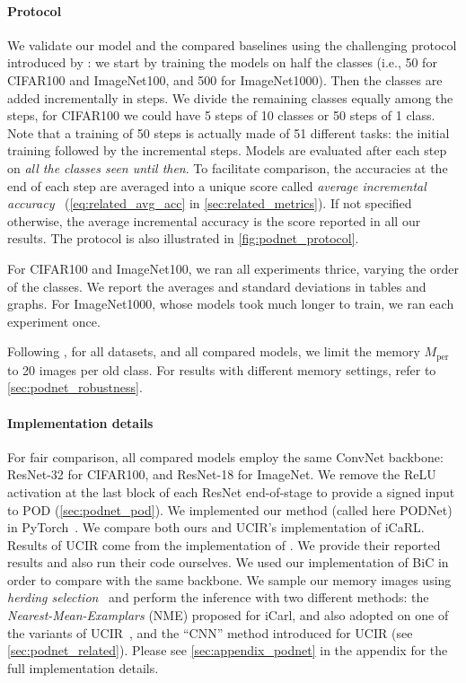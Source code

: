\paragraph{Protocol} We validate our model and the compared baselines using the challenging protocol
introduced by \citet{hou2019ucir}: we start by training the models on half the classes (i.e., 50 for
CIFAR100 and ImageNet100, and 500 for ImageNet1000). Then the classes are added incrementally in
steps. We divide the remaining classes equally among the steps, \eg for CIFAR100 we could have 5
steps of 10 classes or 50 steps of 1 class. Note that a training of 50 steps is actually made of 51
different tasks: the initial training followed by the incremental steps. Models are evaluated after
each step on \textit{all the classes seen until then}. To facilitate comparison, the accuracies at
the end of each step are averaged into a unique score called \textit{average incremental
    accuracy}~\citep{rebuffi2017icarl} (\autoref{eq:related_avg_acc} in \autoref{sec:related_metrics}).
If not specified otherwise, the average incremental accuracy is the score reported in all our
results. The protocol is also illustrated in \autoref{fig:podnet_protocol}.

For CIFAR100 and ImageNet100, we ran all experiments thrice, varying the order of the classes. We
report the averages and standard deviations in tables and graphs. For ImageNet1000, whose models
took much longer to train, we ran each experiment once.

Following \citet{hou2019ucir}, for all datasets, and all compared models, we limit the memory
$M_\textrm{per}$ to 20 images per old class. For results with different memory settings, refer to
\autoref{sec:podnet_robustness}.

\paragraph{Implementation details} For fair comparison, all compared models employ the same
\ac{ConvNet} backbone: ResNet-32 for CIFAR100, and ResNet-18 for ImageNet. We remove the ReLU
activation at the last block of each ResNet end-of-stage to provide a signed input to POD
(\autoref{sec:podnet_pod}). We implemented our method (called here PODNet) in
PyTorch~\citep{paszke2017pytorch}.
%
We compare both ours and UCIR's implementation of iCaRL. Results of UCIR come from the
implementation of \citet{hou2019ucir}. We provide their reported results and also run their code
ourselves. We used our implementation of BiC \citep{wu2019bias_correction} in order to compare with
the same backbone.
%
We sample our memory images using \textit{herding selection}~\citep{rebuffi2017icarl} and perform
the inference with two different methods: the \textit{Nearest-Mean-Examplars} (\ac{NME}) proposed
for iCarl, and also adopted on one of the variants of UCIR~\citep{hou2019ucir}, and the ``CNN''
method introduced for UCIR (see \autoref{sec:podnet_related}).
%
Please see \autoref{sec:appendix_podnet} in the appendix for the full implementation details.


